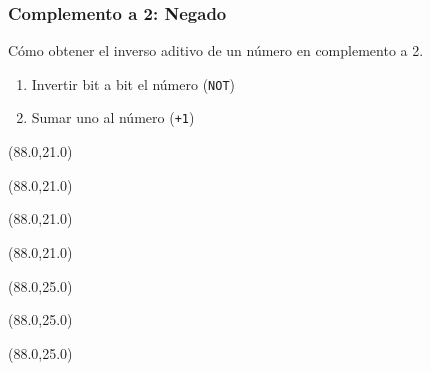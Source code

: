 \documentclass[aspectratio=169]{beamer}
\begin{document}
\begin{frame}[fragile,t]
     \frametitle{\textbf{Complemento a 2}: Negado}
    Cómo obtener el inverso aditivo de un número en complemento a 2.
    \bigskip
    \begin{enumerate}
     \item Invertir bit a bit el número (\texttt{NOT})
     \item Sumar uno al número (\texttt{+1})
    \end{enumerate}
    \bigskip
    \bigskip
    \begin{textblock}{20}(88.0,21.0)  \end{textblock}
    \begin{textblock}{20}(88.0,21.0)  \end{textblock}
    \begin{textblock}{20}(88.0,21.0)  \end{textblock}
    \begin{textblock}{20}(88.0,21.0)  \end{textblock}
    \begin{textblock}{20}(88.0,25.0)  \end{textblock}
    \begin{textblock}{20}(88.0,25.0)  \end{textblock}
    \begin{textblock}{20}(88.0,25.0)  \end{textblock}
\end{frame}
\end{document}
